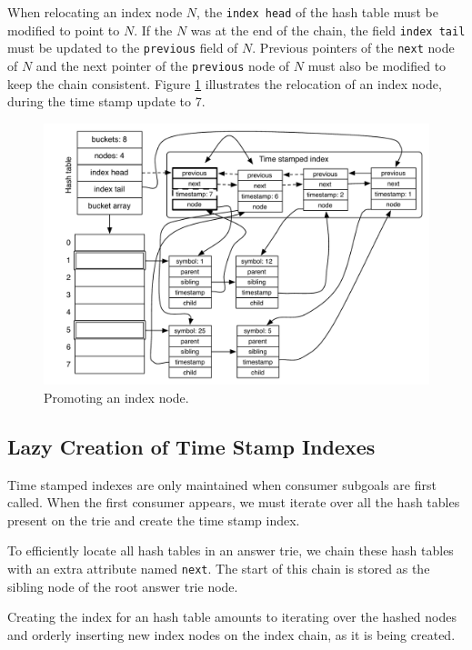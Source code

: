When relocating an index node $N$, the \texttt{index head} of the hash table must be modified
to point to $N$. If the $N$ was at the end of the chain,
the field \texttt{index tail} must be updated to the \texttt{previous} field of $N$.
Previous pointers of the \texttt{next} node of $N$ and the next pointer of
the \texttt{previous} node of $N$ must
also be modified to keep the chain consistent.
Figure \ref{fig:hash_table_promote} illustrates the relocation of an index node, during
the time stamp update to 7.

\begin{figure}[ht]
  \centering
    \includegraphics[scale=0.6]{hash_table_promote.pdf}
  \caption{Promoting an index node.}
  \label{fig:hash_table_promote}
\end{figure}

\subsection{Lazy Creation of Time Stamp Indexes}

Time stamped indexes are only maintained when consumer subgoals are first called.
When the first consumer appears, we must iterate over all the hash tables present
on the trie and create the time stamp index.

To efficiently locate all hash tables in an answer trie, we chain these hash tables
with an extra attribute named \texttt{next}. The start of this chain is stored
as the sibling node of the root answer trie node.

Creating the index for an hash table amounts to iterating over the hashed nodes
and orderly inserting new index nodes on the index chain, as it is being created.


